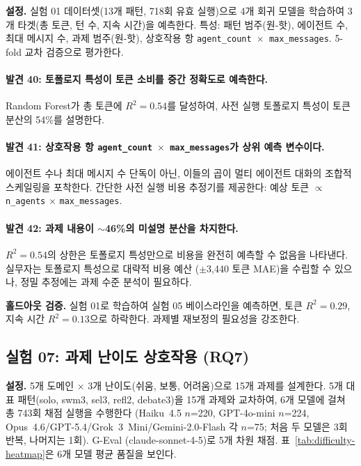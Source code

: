 \documentclass[a4paper,11pt]{article}
\begin{document}
\textbf{설정.} 실험 01 데이터셋(13개 패턴, 718회 유효 실행)으로 4개 회귀 모델을 학습하여 3개 타겟(총 토큰, 턴 수, 지속 시간)을 예측한다. 특성: 패턴 범주(원-핫), 에이전트 수, 최대 메시지 수, 과제 범주(원-핫), 상호작용 항 \texttt{agent\_count $\times$ max\_messages}. 5-fold 교차 검증으로 평가한다.



\paragraph{발견 40: 토폴로지 특성이 토큰 소비를 중간 정확도로 예측한다.}
Random Forest가 총 토큰에 $R^{2}=0.54$를 달성하여, 사전 실행 토폴로지 특성이 토큰 분산의 54\%를 설명한다.

\paragraph{발견 41: 상호작용 항 \texttt{agent\_count $\times$ max\_messages}가 상위 예측 변수이다.}
에이전트 수나 최대 메시지 수 단독이 아닌, 이들의 곱이 멀티 에이전트 대화의 조합적 스케일링을 포착한다. 간단한 사전 실행 비용 추정기를 제공한다: 예상 토큰 $\propto$ \texttt{n\_agents} $\times$ \texttt{max\_messages}.

\paragraph{발견 42: 과제 내용이 $\sim$46\%의 미설명 분산을 차지한다.}
$R^{2}=0.54$의 상한은 토폴로지 특성만으로 비용을 완전히 예측할 수 없음을 나타낸다. 실무자는 토폴로지 특성으로 대략적 비용 예산 ($\pm$3,440 토큰 MAE)을 수립할 수 있으나, 정밀 추정에는 과제 수준 분석이 필요하다.

\textbf{홀드아웃 검증.} 실험 01로 학습하여 실험 05 베이스라인을 예측하면, 토큰 $R^{2}=0.29$, 지속 시간 $R^{2}=0.13$으로 하락한다. 과제별 재보정의 필요성을 강조한다.

\subsection{실험 07: 과제 난이도 상호작용 (RQ7)}
\label{sec:exp07}

\textbf{설정.} 5개 도메인 $\times$ 3개 난이도(쉬움, 보통, 어려움)으로 15개 과제를 설계한다. 5개 대표 패턴(solo, swm3, sel3, refl2, debate3)을 15개 과제와 교차하여, 6개 모델에 걸쳐 총 743회 채점 실행을 수행한다 (Haiku~4.5 $n$=220, GPT-4o-mini $n$=224, Opus~4.6/GPT-5.4/Grok~3~Mini/Gemini-2.0-Flash 각 $n$=75; 처음 두 모델은 3회 반복, 나머지는 1회). G-Eval (claude-sonnet-4-5)로 5개 차원 채점. 표~\ref{tab:difficulty-heatmap}은 6개 모델 평균 품질을 보인다.
\end{document}
